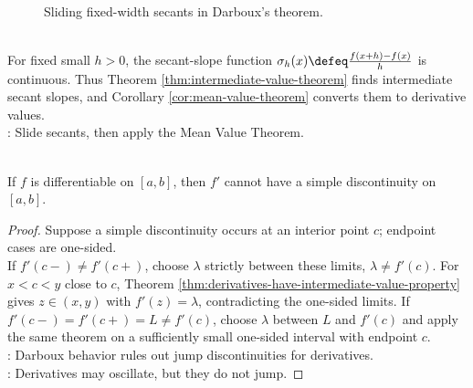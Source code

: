 \begin{figure}[H]
  \centering
  
  \caption{Sliding fixed-width secants in Darboux's theorem.}
  \label{fig:sliding-secant-darboux-derivative}
\end{figure}

\begin{perspective} \label{per:sliding-secant-proof-of-darboux} \\
For fixed small $h>0$, the secant-slope function $\sigma_h(x)\defeq \frac{f(x+h)-f(x)}{h}$ is continuous. Thus Theorem \ref{thm:intermediate-value-theorem} finds intermediate secant slopes, and Corollary \ref{cor:mean-value-theorem} converts them to derivative values.\\
: Slide secants, then apply the Mean Value Theorem.
\end{perspective}

\begin{corollary} \label{cor:derivatives-no-simple-discontinuities} \\
If $f$ is differentiable on $[a,b]$, then $f'$ cannot have a simple discontinuity on $[a,b]$.
\begin{proof}
Suppose a simple discontinuity occurs at an interior point $c$; endpoint cases are one-sided.\\
If $f'(c-)\neq f'(c+)$, choose $\lambda$ strictly between these limits, $\lambda\neq f'(c)$. For $x<c<y$ close to $c$, Theorem \ref{thm:derivatives-have-intermediate-value-property} gives $z\in(x,y)$ with $f'(z)=\lambda$, contradicting the one-sided limits. If $f'(c-)=f'(c+)=L\neq f'(c)$, choose $\lambda$ between $L$ and $f'(c)$ and apply the same theorem on a sufficiently small one-sided interval with endpoint $c$.\\
: Darboux behavior rules out jump discontinuities for derivatives.\\
: Derivatives may oscillate, but they do not jump.
\end{proof}
\end{corollary}

